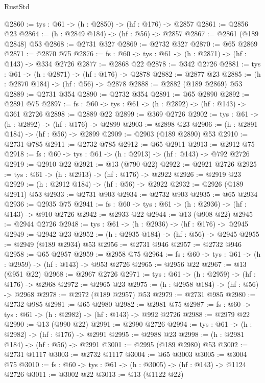 \begin{lexlean}{RustStd}
\begin{coremodule}
@2860 := {tys : @61} -> (h : @2850) -> (hf : @176) -> @2857
@2861 := @2856 @23
@2864 := (h : @2849 @184) -> (hf : @56) -> @2857
@2867 := @2861 (@189 @2848) @53
@2868 := @2731 @327
@2869 := @2732 @327
@2870 := @65 @2869
@2871 := @2870 @75
@2876 := {fs : @60} -> {tys : @61} -> (h : @2871) -> (hf : @143) -> @334 @2726
@2877 := @2868 @22
@2878 := @342 @2726
@2881 := {tys : @61} -> (h : @2871) -> (hf : @176) -> @2878
@2882 := @2877 @23
@2885 := (h : @2870 @184) -> (hf : @56) -> @2878
@2888 := @2882 (@189 @2869) @53
@2889 := @2731 @354
@2890 := @2732 @354
@2891 := @65 @2890
@2892 := @2891 @75
@2897 := {fs : @60} -> {tys : @61} -> (h : @2892) -> (hf : @143) -> @361 @2726
@2898 := @2889 @22
@2899 := @369 @2726
@2902 := {tys : @61} -> (h : @2892) -> (hf : @176) -> @2899
@2903 := @2898 @23
@2906 := (h : @2891 @184) -> (hf : @56) -> @2899
@2909 := @2903 (@189 @2890) @53
@2910 := @2731 @785
@2911 := @2732 @785
@2912 := @65 @2911
@2913 := @2912 @75
@2918 := {fs : @60} -> {tys : @61} -> (h : @2913) -> (hf : @143) -> @792 @2726
@2919 := @2910 @22
@2921 := @13 (@790 @22)
@2922 := @2921 @2726
@2925 := {tys : @61} -> (h : @2913) -> (hf : @176) -> @2922
@2926 := @2919 @23
@2929 := (h : @2912 @184) -> (hf : @56) -> @2922
@2932 := @2926 (@189 @2911) @53
@2933 := @2731 @903
@2934 := @2732 @903
@2935 := @65 @2934
@2936 := @2935 @75
@2941 := {fs : @60} -> {tys : @61} -> (h : @2936) -> (hf : @143) -> @910 @2726
@2942 := @2933 @22
@2944 := @13 (@908 @22)
@2945 := @2944 @2726
@2948 := {tys : @61} -> (h : @2936) -> (hf : @176) -> @2945
@2949 := @2942 @23
@2952 := (h : @2935 @184) -> (hf : @56) -> @2945
@2955 := @2949 (@189 @2934) @53
@2956 := @2731 @946
@2957 := @2732 @946
@2958 := @65 @2957
@2959 := @2958 @75
@2964 := {fs : @60} -> {tys : @61} -> (h : @2959) -> (hf : @143) -> @953 @2726
@2965 := @2956 @22
@2967 := @13 (@951 @22)
@2968 := @2967 @2726
@2971 := {tys : @61} -> (h : @2959) -> (hf : @176) -> @2968
@2972 := @2965 @23
@2975 := (h : @2958 @184) -> (hf : @56) -> @2968
@2978 := @2972 (@189 @2957) @53
@2979 := @2731 @985
@2980 := @2732 @985
@2981 := @65 @2980
@2982 := @2981 @75
@2987 := {fs : @60} -> {tys : @61} -> (h : @2982) -> (hf : @143) -> @992 @2726
@2988 := @2979 @22
@2990 := @13 (@990 @22)
@2991 := @2990 @2726
@2994 := {tys : @61} -> (h : @2982) -> (hf : @176) -> @2991
@2995 := @2988 @23
@2998 := (h : @2981 @184) -> (hf : @56) -> @2991
@3001 := @2995 (@189 @2980) @53
@3002 := @2731 @1117
@3003 := @2732 @1117
@3004 := @65 @3003
@3005 := @3004 @75
@3010 := {fs : @60} -> {tys : @61} -> (h : @3005) -> (hf : @143) -> @1124 @2726
@3011 := @3002 @22
@3013 := @13 (@1122 @22)

\end{coremodule}
\end{lexlean}
